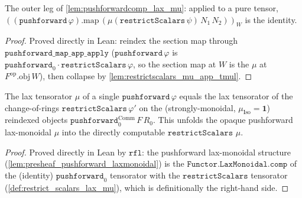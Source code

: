 \begin{lemma}
  \label{lem:pushforward_map_restrictscalars_mu_app_tmul}
  The outer leg of \cref{lem:pushforwardcomp_lax_mu}: applied to a pure tensor,
  \(((\mathtt{pushforward}\,\varphi).\mathrm{map}\,(\mu(\mathtt{restrictScalars}\,\psi)
  \,N_1\,N_2))_W\) is the identity.
\end{lemma}
\begin{proof}
  \leanok
  Proved directly in Lean: reindex the section map through \(\mathtt{pushforward\_map\_app\_apply}\)
  (\(\mathtt{pushforward}\,\varphi\) is \(\mathtt{pushforward}_0 \cdot \mathtt{restrictScalars}\,\varphi\),
  so the section map at \(W\) is the \(\mu\) at \(F^{\mathrm{op}}.\mathrm{obj}\,W\)), then collapse
  by \cref{lem:restrictscalars_mu_app_tmul}.
\end{proof}

\begin{lemma}
  \label{lem:pushforward_mu_eq}
  The lax tensorator \(\mu\) of a single \(\mathtt{pushforward}\,\varphi\) equals the lax
  tensorator of the change-of-rings \(\mathtt{restrictScalars}\,\varphi'\) on the
  (strongly-monoidal, \(\mu_{\mathrm{Iso}} = \mathbf{1}\)) reindexed objects
  \(\mathtt{pushforward}_0^{\mathrm{Comm}}\,F\,R_0\). This unfolds the opaque pushforward
  lax-monoidal \(\mu\) into the directly computable \(\mathtt{restrictScalars}\) \(\mu\).
\end{lemma}
\begin{proof}
  \leanok
  Proved directly in Lean by \(\mathtt{rfl}\): the pushforward lax-monoidal structure
  (\cref{lem:presheaf_pushforward_laxmonoidal}) is the \(\mathtt{Functor.LaxMonoidal.comp}\)
  of the (identity) \(\mathtt{pushforward}_0\) tensorator with the
  \(\mathtt{restrictScalars}\) tensorator (\cref{def:restrict_scalars_lax_mu}), which is
  definitionally the right-hand side.
\end{proof}

